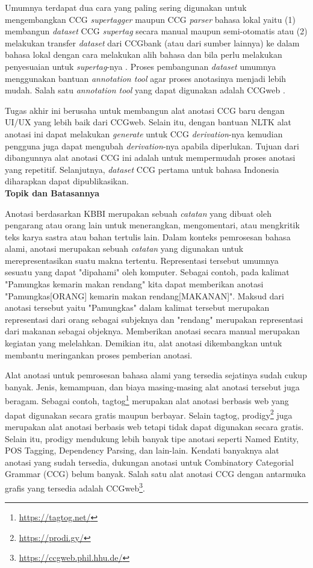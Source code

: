 Umumnya terdapat dua cara yang paling sering digunakan untuk mengembangkan CCG \textit{supertagger}
maupun CCG \textit{parser} bahasa lokal yaitu (1) membangun \textit{dataset} CCG \textit{supertag}
secara manual maupun semi-otomatis atau (2) melakukan transfer \textit{dataset} dari CCGbank
(atau dari sumber lainnya) ke dalam bahasa lokal dengan cara melakukan alih bahasa dan bila perlu
melakukan penyesuaian untuk \textit{supertag}-nya \citep{hockenmaier-steedman-2007-ccgbank}.
Proses pembangunan \textit{dataset} umumnya menggunakan bantuan \textit{annotation tool} agar
proses anotasinya menjadi lebih mudah.
Salah satu \textit{annotation tool} yang dapat digunakan adalah
CCGweb \citep{evang-etal-2019-ccgweb}.

Tugas akhir ini berusaha untuk membangun alat anotasi CCG baru dengan
UI/UX yang lebih baik dari CCGweb.
Selain itu, dengan bantuan NLTK alat anotasi ini dapat melakukan \textit{generate} untuk
CCG \textit{derivation}-nya kemudian pengguna juga dapat mengubah \textit{derivation}-nya
apabila diperlukan.
Tujuan dari dibangunnya alat anotasi CCG ini adalah untuk mempermudah proses anotasi yang
repetitif.
Selanjutnya, \textit{dataset} CCG pertama untuk bahasa Indonesia diharapkan dapat dipublikasikan.
\\


\noindent\textbf{Topik dan Batasannya}

Anotasi berdasarkan KBBI merupakan sebuah \textit{catatan} yang dibuat oleh pengarang atau
orang lain untuk menerangkan, mengomentari, atau mengkritik teks karya sastra atau
bahan tertulis lain. Dalam konteks pemrosesan bahasa alami, anotasi merupakan sebuah
\textit{catatan} yang digunakan untuk merepresentasikan suatu makna tertentu.
Representasi tersebut umumnya sesuatu yang dapat "dipahami" oleh komputer.
Sebagai contoh, pada kalimat "Pamungkas kemarin makan rendang" kita dapat memberikan anotasi
"Pamungkas[ORANG] kemarin makan rendang[MAKANAN]". Maksud dari anotasi tersebut yaitu "Pamungkas"
dalam kalimat tersebut merupakan representasi dari orang sebagai subjeknya dan "rendang"
merupakan representasi dari makanan sebagai objeknya. Memberikan anotasi secara manual merupakan
kegiatan yang melelahkan. Demikian itu, alat anotasi dikembangkan untuk membantu meringankan
proses pemberian anotasi.

Alat anotasi untuk pemrosesan bahasa alami yang tersedia sejatinya sudah cukup banyak.
Jenis, kemampuan, dan biaya masing-masing alat anotasi tersebut juga beragam. Sebagai contoh,
tagtog\footnote{\url{https://tagtog.net/}} merupakan alat anotasi berbasis web yang dapat digunakan
secara gratis maupun berbayar. Selain tagtog, prodigy\footnote{\url{https://prodi.gy/}} juga
merupakan alat anotasi berbasis web tetapi tidak dapat digunakan secara gratis. Selain itu, prodigy
mendukung lebih banyak tipe anotasi seperti Named Entity, POS Tagging, Dependency Parsing,
dan lain-lain. Kendati banyaknya alat anotasi yang sudah tersedia, dukungan anotasi untuk
Combinatory Categorial Grammar (CCG) belum banyak. Salah satu alat anotasi CCG dengan antarmuka
grafis yang tersedia adalah CCGweb\footnote{\url{https://ccgweb.phil.hhu.de/}}.

